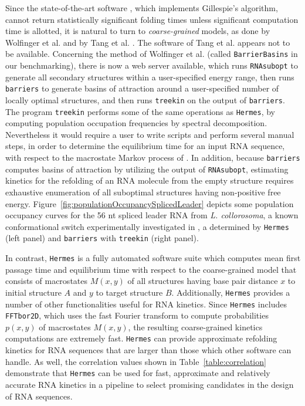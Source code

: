 Since the state-of-the-art software \kinfold, which implements
Gillespie's algorithm, cannot return statistically significant folding
times unless significant computation time is allotted, it is natural
to turn to {\em coarse-grained} models, as done by
Wolfinger et al. \cite{wolfingerStadler:kinetics} and by
Tang et al. \cite{Tang.jmb08}.  The software of Tang et al. appears not
to be available. Concerning the
method of Wolfinger et al. (called {\tt BarrierBasins} in our benchmarking),
there is now a web server available, which runs {\tt RNAsubopt}
\cite{Wuchty.b99} to generate all secondary structures within a user-specified
energy range, then runs {\tt barriers} \cite{flammHofacker} to generate
basins of attraction around a user-specified number of locally optimal
structures, and then runs {\tt treekin} on the output of {\tt barriers}.
The program {\tt treekin} performs some of the same operations as {\tt Hermes},
by computing population occupation frequencies by spectral decomposition.
Nevertheless it would require a user to write scripts and perform
several manual steps, in order to determine the equilibrium time for
an input RNA sequence, with respect to the macrostate Markov process
of \cite{wolfingerStadler:kinetics}. In addition, because {\tt barriers} computes
basins of attraction by utilizing the output of {\tt RNAsubopt}, estimating kinetics for the
refolding of an RNA molecule from the empty structure requires exhaustive enumeration
of all suboptimal structures having non-positive free energy.
Figure~\ref{fig:populationOccupancySplicedLeader} depicts some population
occupancy curves for the 56 nt spliced leader RNA from
{\em L. collorosoma}, a known conformational switch experimentally
investigated in \cite{lecuyerCrothers}, a determined by
{\tt Hermes} (left panel) and {\tt barriers} with {\tt treekin}
(right panel).

In contrast, {\tt Hermes} is a fully automated software suite which
computes mean first passage time and equilibrium time with respect to
the coarse-grained model that consists of macrostates $M(x,y)$ of all
structures having base pair distance $x$ to initial structure $A$ and
$y$ to target structure $B$. Additionally, {\tt Hermes} provides
a number of other functionalities useful for RNA kinetics. Since
{\tt Hermes} includes {\tt FFTbor2D}, which uses the fast Fourier transform
to compute probabilities $p(x,y)$ of macrostates $M(x,y)$, the resulting
coarse-grained kinetics computations are extremely fast. {\tt Hermes}
can provide approximate refolding kinetics for RNA sequences that are
larger than those which other software can handle. As well, the
correlation values shown in Table~\ref{table:correlation}
demonstrate that {\tt Hermes} can be used for fast, approximate and relatively
accurate RNA kinetics in a pipeline to select promising candidates in
the design of RNA sequences.



